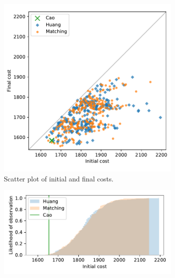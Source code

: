 \documentclass[smallextended]{svjour3}
\begin{document}
\begin{figure}
    \begin{subfigure}{.5\textwidth}
        \includegraphics[width=\linewidth]{Fig4a.pdf}
        \caption{Scatter plot of initial and final costs.}
    \end{subfigure}
    \hfill%
    \begin{subfigure}{.5\textwidth}
        \includegraphics[width=\linewidth]{Fig4b1.pdf}


\end{subfigure}
\end{figure}
\end{document}
